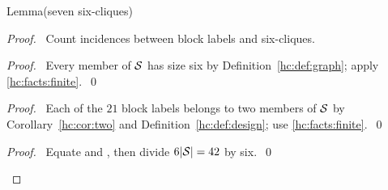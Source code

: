 \begin{mergedproofsection}
\begin{namedresult}{Lemma}{(seven six-cliques)}\label{hc:lem:seven}
 \leavevmode\par
\end{namedresult}
\begin{proof}
 \pfsketch\ Count incidences between block labels and six-cliques.
 \begin{proof}\pf\ Every member of ${\mathcal S}$ has size six by
  Definition~\ref{hc:def:graph}; apply \ref{hc:facts:finite}.~\qed\end{proof}
 \begin{proof}\pf\ Each of the $21$ block labels belongs to two
  members of ${\mathcal S}$ by Corollary~\ref{hc:cor:two} and
  Definition~\ref{hc:def:design}; use \ref{hc:facts:finite}.~\qed\end{proof}
 \qedstep
 \begin{proof}\pf\ Equate  and
  , then divide $6|{\mathcal S}|=42$ by six.~\qed\end{proof}
\end{proof}


\end{mergedproofsection}
